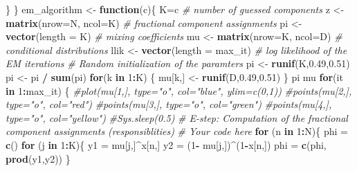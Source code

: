 \documentclass[]{article}
\newenvironment{Shaded}{\begin{snugshade}}{\end{snugshade}}
\newcommand{\CommentTok}[1]{\textcolor[rgb]{0.56,0.35,0.01}{\textit{#1}}}
\newcommand{\ControlFlowTok}[1]{\textcolor[rgb]{0.13,0.29,0.53}{\textbf{#1}}}
\newcommand{\DataTypeTok}[1]{\textcolor[rgb]{0.13,0.29,0.53}{#1}}
\newcommand{\DecValTok}[1]{\textcolor[rgb]{0.00,0.00,0.81}{#1}}
\newcommand{\FloatTok}[1]{\textcolor[rgb]{0.00,0.00,0.81}{#1}}
\newcommand{\KeywordTok}[1]{\textcolor[rgb]{0.13,0.29,0.53}{\textbf{#1}}}
\newcommand{\NormalTok}[1]{#1}
\newcommand{\OperatorTok}[1]{\textcolor[rgb]{0.81,0.36,0.00}{\textbf{#1}}}
\newcommand{\StringTok}[1]{\textcolor[rgb]{0.31,0.60,0.02}{#1}}
\begin{document}
\begin{Shaded}
\begin{Highlighting}[]
\NormalTok{  \}}
\NormalTok{\}}
\NormalTok{em_algorithm <-}\StringTok{ }\ControlFlowTok{function}\NormalTok{(c)\{}
\NormalTok{  K=c }\CommentTok{# number of guessed components}
\NormalTok{  z <-}\StringTok{ }\KeywordTok{matrix}\NormalTok{(}\DataTypeTok{nrow=}\NormalTok{N, }\DataTypeTok{ncol=}\NormalTok{K) }\CommentTok{# fractional component assignments}
\NormalTok{  pi <-}\StringTok{ }\KeywordTok{vector}\NormalTok{(}\DataTypeTok{length =}\NormalTok{ K) }\CommentTok{# mixing coefficients}
\NormalTok{  mu <-}\StringTok{ }\KeywordTok{matrix}\NormalTok{(}\DataTypeTok{nrow=}\NormalTok{K, }\DataTypeTok{ncol=}\NormalTok{D) }\CommentTok{# conditional distributions}
\NormalTok{  llik <-}\StringTok{ }\KeywordTok{vector}\NormalTok{(}\DataTypeTok{length =}\NormalTok{ max_it) }\CommentTok{# log likelihood of the EM iterations}
  \CommentTok{# Random initialization of the paramters}
\NormalTok{  pi <-}\StringTok{ }\KeywordTok{runif}\NormalTok{(K,}\FloatTok{0.49}\NormalTok{,}\FloatTok{0.51}\NormalTok{)}
\NormalTok{  pi <-}\StringTok{ }\NormalTok{pi }\OperatorTok{/}\StringTok{ }\KeywordTok{sum}\NormalTok{(pi)}
  \ControlFlowTok{for}\NormalTok{(k }\ControlFlowTok{in} \DecValTok{1}\OperatorTok{:}\NormalTok{K) \{}
\NormalTok{    mu[k,] <-}\StringTok{ }\KeywordTok{runif}\NormalTok{(D,}\FloatTok{0.49}\NormalTok{,}\FloatTok{0.51}\NormalTok{)}
\NormalTok{  \}}
\NormalTok{  pi}
\NormalTok{  mu}
  \ControlFlowTok{for}\NormalTok{(it }\ControlFlowTok{in} \DecValTok{1}\OperatorTok{:}\NormalTok{max_it) \{}
    \CommentTok{#plot(mu[1,], type="o", col="blue", ylim=c(0,1))}
    \CommentTok{#points(mu[2,], type="o", col="red")}
    \CommentTok{#points(mu[3,], type="o", col="green")}
    \CommentTok{#points(mu[4,], type="o", col="yellow")}
    \CommentTok{#Sys.sleep(0.5)}
    \CommentTok{# E-step: Computation of the fractional component assignments (responsiblities)}
    \CommentTok{# Your code here}
    \ControlFlowTok{for}\NormalTok{ (n }\ControlFlowTok{in} \DecValTok{1}\OperatorTok{:}\NormalTok{N)\{}
\NormalTok{      phi =}\StringTok{ }\KeywordTok{c}\NormalTok{()}
      \ControlFlowTok{for}\NormalTok{ (j }\ControlFlowTok{in} \DecValTok{1}\OperatorTok{:}\NormalTok{K)\{}
\NormalTok{        y1 =}\StringTok{ }\NormalTok{mu[j,]}\OperatorTok{^}\NormalTok{x[n,]}
\NormalTok{        y2 =}\StringTok{ }\NormalTok{(}\DecValTok{1}\OperatorTok{-}\StringTok{ }\NormalTok{mu[j,])}\OperatorTok{^}\NormalTok{(}\DecValTok{1}\OperatorTok{-}\NormalTok{x[n,])}
\NormalTok{        phi =}\StringTok{ }\KeywordTok{c}\NormalTok{(phi, }\KeywordTok{prod}\NormalTok{(y1,y2))}
\NormalTok{      \}}
      

\end{Highlighting}
\end{Shaded}
\end{document}
